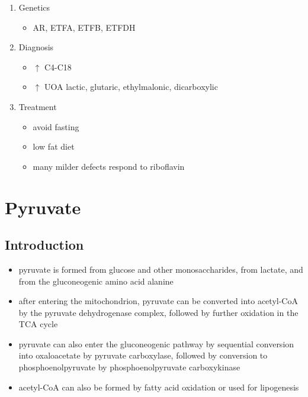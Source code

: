 \documentclass{scrartcl}
\begin{document}
\begin{enumerate}
\begin{enumerate}
\item Genetics
\label{sec:orgfe30bf1}
\begin{itemize}
\item AR, ETFA, ETFB, ETFDH
\end{itemize}

\item Diagnosis
\label{sec:org40e16c6}
\begin{itemize}
\item \(\uparrow\) C4-C18
\item \(\uparrow\) UOA lactic, glutaric, ethylmalonic, dicarboxylic
\end{itemize}
\item Treatment
\label{sec:orge212151}
\begin{itemize}
\item avoid fasting
\item low fat diet
\item many milder defects respond to riboflavin
\end{itemize}
\end{enumerate}
\end{enumerate}
\section{Pyruvate}
\label{sec:orga54590b}
\subsection{Introduction}
\label{sec:org9e619f3}
\begin{itemize}
\item pyruvate is formed from glucose and other monosaccharides, from
lactate, and from the gluconeogenic amino acid alanine
\item after entering the mitochondrion, pyruvate can be converted into
acetyl-CoA by the pyruvate dehydrogenase complex, followed by
further oxidation in the TCA cycle
\item pyruvate can also enter the gluconeogenic pathway by sequential
conversion into oxaloacetate by pyruvate carboxylase, followed by
conversion to phosphoenolpyruvate by phosphoenolpyruvate
carboxykinase
\item acetyl-CoA can also be formed by fatty acid oxidation or used for
lipogenesis
\end{itemize}
\end{document}
